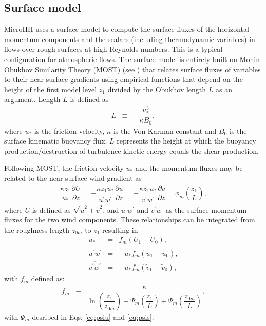 \documentclass[gmd,manuscript]{copernicus}
\newcommand{\uf}{\ensuremath{\widetilde{u}}}
\newcommand{\vf}{\ensuremath{\widetilde{v}}}
\begin{document}
\subsection{Surface model}\label{sec:surface_model}
MicroHH uses a surface model to compute the surface fluxes of the horizontal momentum components and the scalars (including thermodynamic variables) in flows over rough surfaces at high Reynolds numbers. This is a typical configuration for atmospheric flows. The surface model is entirely built on Monin-Obukhov Similarity Theory (MOST) (see \citet{Wyngaard2010}) that relates surface fluxes of variables to their near-surface gradients using empirical functions that depend on the height of the first model level $z_1$ divided by the Obukhov length $L$ as an argument. Length $L$ is defined as
\begin{eqnarray}
L   & \equiv & - \dfrac{u_*^3}{\kappa B_0},
\end{eqnarray}
where $u_*$ is the friction velocity, $\kappa$ is the Von Karman constant and $B_0$ is the surface kinematic buoyancy flux. $L$ represents the height at which the buoyancy production/destruction of turbulence kinetic energy equals the shear production.

Following MOST, the friction velocity $u_*$ and the momentum fluxes may be related to the near-surface wind gradient as
\begin{eqnarray}
\dfrac{\kappa z_1}{u_*} \dfrac{\partial U}{\partial z}  = 
- \dfrac{\kappa z_1 u_*}{\overline{u^\prime w^\prime}} \dfrac{\partial \uf}{\partial z} =
- \dfrac{\kappa z_1 u_*}{\overline{v^\prime w^\prime}} \dfrac{\partial \vf}{\partial z} =
\phi_m \left( \dfrac{z_1}{L} \right),\label{eq:surf_grad}
\end{eqnarray}
where $U$ is defined as $\sqrt{\uf^2 + \vf^2}$, and $\overline{u^\prime w^\prime}$ and $\overline{v^\prime w^\prime}$ as the surface momentum fluxes for the two wind components. These relationships can be integrated from the roughness length $z_{0m}$ to $z_1$ resulting in 
\begin{eqnarray}
u_* & =  & f_m \left( U_1 - U_0 \right),\\
\overline{u^\prime w^\prime} & = & - u_* f_m \left( \uf_1 - \uf_0 \right),\\
\overline{v^\prime w^\prime} & = & - u_* f_m \left( \vf_1 - \vf_0 \right),
\end{eqnarray}
with $f_m$ defined as:
\begin{eqnarray}
f_m & \equiv & \dfrac{\kappa}
{ \ln{\left( \dfrac{z_1}{z_{0m}} \right)}
	- \varPsi_m \left( \dfrac{z_1}{L} \right)
	+ \varPsi_m \left( \dfrac{z_{0m}}{L} \right) },
\end{eqnarray}
with $\varPsi_m$ desribed in Eqs. \ref{eq:psiu} and \ref{eq:psis}.
\end{document}
